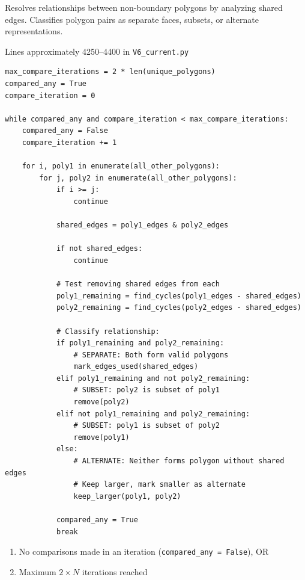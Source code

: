 Resolves relationships between non-boundary polygons by analyzing shared edges. Classifies polygon pairs as separate faces, subsets, or alternate representations.

Lines approximately 4250--4400 in \texttt{V6\_current.py}

\begin{lstlisting}
max_compare_iterations = 2 * len(unique_polygons)
compared_any = True
compare_iteration = 0

while compared_any and compare_iteration < max_compare_iterations:
    compared_any = False
    compare_iteration += 1
    
    for i, poly1 in enumerate(all_other_polygons):
        for j, poly2 in enumerate(all_other_polygons):
            if i >= j:
                continue
            
            shared_edges = poly1_edges & poly2_edges
            
            if not shared_edges:
                continue
            
            # Test removing shared edges from each
            poly1_remaining = find_cycles(poly1_edges - shared_edges)
            poly2_remaining = find_cycles(poly2_edges - shared_edges)
            
            # Classify relationship:
            if poly1_remaining and poly2_remaining:
                # SEPARATE: Both form valid polygons
                mark_edges_used(shared_edges)
            elif poly1_remaining and not poly2_remaining:
                # SUBSET: poly2 is subset of poly1
                remove(poly2)
            elif not poly1_remaining and poly2_remaining:
                # SUBSET: poly1 is subset of poly2
                remove(poly1)
            else:
                # ALTERNATE: Neither forms polygon without shared edges
                # Keep larger, mark smaller as alternate
                keep_larger(poly1, poly2)
            
            compared_any = True
            break
\end{lstlisting}

\begin{enumerate}
    \item No comparisons made in an iteration (\texttt{compared\_any = False}), OR
    \item Maximum $2 \times N$ iterations reached
\end{enumerate}


